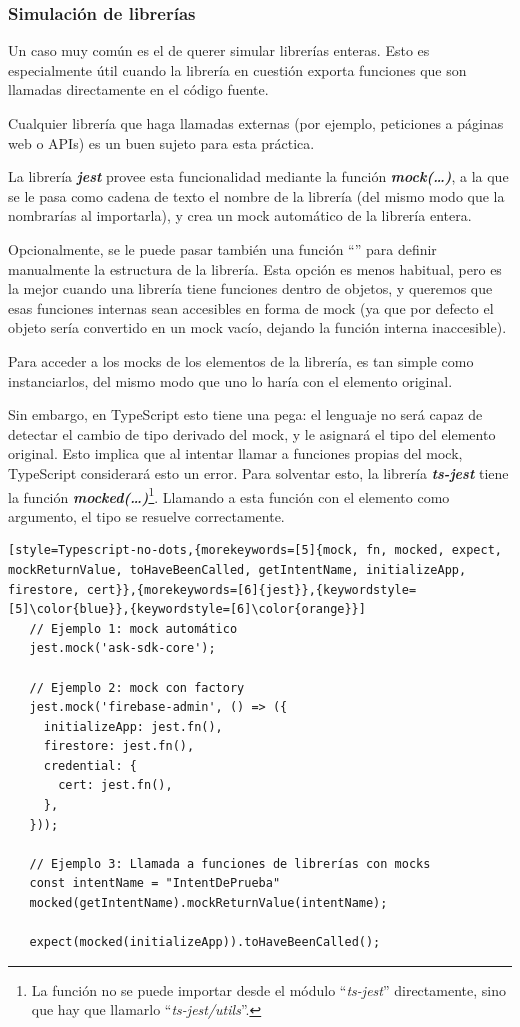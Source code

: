\documentclass[11pt,spanish,listoffigures,listoftables,table,hyphens,dvipsnames]{tfgetsinf}
\newcommand{\fe}[1]{\foreign{english}{#1}}
\begin{document}
\subsubsection{Simulación de librerías} %

Un caso muy común es el de querer simular librerías enteras. Esto es especialmente útil cuando la librería en cuestión exporta funciones que son llamadas directamente en el código fuente.

Cualquier librería que haga llamadas externas (por ejemplo, peticiones a páginas web o APIs) es un buen sujeto para esta práctica.

La librería \textbf{\emph{jest}} provee esta funcionalidad mediante la función \textbf{\emph{mock(\dots)}}, a la que se le pasa como cadena de texto el nombre de la librería (del mismo modo que la nombrarías al importarla), y crea un mock automático de la librería entera.

Opcionalmente, se le puede pasar también una función ``\fe{factory}'' para definir manualmente la estructura de la librería. Esta opción es menos habitual, pero es la mejor cuando una librería tiene funciones dentro de objetos, y queremos que esas funciones internas sean accesibles en forma de mock (ya que por defecto el objeto sería convertido en un mock vacío, dejando la función interna inaccesible).

Para acceder a los mocks de los elementos de la librería, es tan simple como instanciarlos, del mismo modo que uno lo haría con el elemento original.

Sin embargo, en TypeScript esto tiene una pega: el lenguaje no será capaz de detectar el cambio de tipo derivado del mock, y le asignará el tipo del elemento original. Esto implica que al intentar llamar a funciones propias del mock, TypeScript considerará esto un error. Para solventar esto, la librería \textbf{\emph{ts-jest}} tiene la función \textbf{\emph{mocked(\dots)}}\footnote{La función no se puede importar desde el módulo ``\emph{ts-jest}'' directamente, sino que hay que llamarlo ``\emph{ts-jest/utils}''.}. Llamando a esta función con el elemento como argumento, el tipo se resuelve correctamente.

\begin{lstlisting}[style=Typescript-no-dots,{morekeywords=[5]{mock, fn, mocked, expect, mockReturnValue, toHaveBeenCalled, getIntentName, initializeApp, firestore, cert}},{morekeywords=[6]{jest}},{keywordstyle=[5]\color{blue}},{keywordstyle=[6]\color{orange}}]
   // Ejemplo 1: mock automático
   jest.mock('ask-sdk-core');
   
   // Ejemplo 2: mock con factory
   jest.mock('firebase-admin', () => ({
     initializeApp: jest.fn(),
     firestore: jest.fn(),
     credential: {
       cert: jest.fn(),
     },
   }));

   // Ejemplo 3: Llamada a funciones de librerías con mocks
   const intentName = "IntentDePrueba"
   mocked(getIntentName).mockReturnValue(intentName);

   expect(mocked(initializeApp)).toHaveBeenCalled();
\end{lstlisting}
\end{document}
